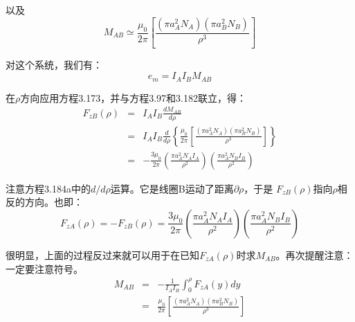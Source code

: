以及
\begin{equation}%
M_{AB}\simeq\frac{\mu_0}{2\pi}\left[\frac{(\pi a_{A}^{2}N_A)(\pi a_{B}^{2}N_B)}{\rho^3}\right]
\end{equation}

对这个系统，我们有：
\begin{equation}%
e_m=I_AI_BM_{AB}
\end{equation}

在$\rho$方向应用方程3.173，并与方程3.97和3.182联立，得：
\begin{eqnarray}%
F_{zB}(\rho)&=&I_A I_B\frac{dM_{AB}}{d\rho}\\
&=&I_A I_B\frac{d}{d\rho}\left\{\frac{\mu_0}{2\pi}\left[\frac{(\pi a_{A}^{2}N_A)(\pi a_{B}^{2}N_B)}{\rho^3}\right]\right\}\\
&=&-\frac{3\mu_0}{2\pi}\left(\frac{\pi a_{A}^{2}N_A I_A}{\rho^2}\right)\left(\frac{\pi a_{A}^{2}N_B I_B}{\rho^2}\right)
\end{eqnarray}

注意方程3.184a中的$d/d\rho$运算。它是线圈B运动了距离$\partial\rho$，于是
$F_{zB}(\rho)$指向$\rho$相反的方向。也即：
\begin{equation}%
F_{zA}(\rho)=-F_{zB}(\rho)
=\frac{3\mu_0}{2\pi}\left(\frac{\pi a_{A}^{2}N_A I_A}{\rho^2}\right)\left(\frac{\pi a_{A}^{2}N_B I_B}{\rho^2}\right)
\end{equation}

很明显，上面的过程反过来就可以用于在已知$F_{zA}(\rho)$时求$M_{AB}$。再次提醒注意：一定要注意符号。
\begin{eqnarray}%
M_{AB}&=&-\frac{1}{I_AI_B}\int_{0}^{\rho}F_{zA}(y)dy\\
&=&\frac{\mu_0}{2\pi}\left[\frac{(\pi a_{A}^{2}N_A)(\pi a_{B}^{2}N_B)}{\rho^3}\right]
\end{eqnarray}
